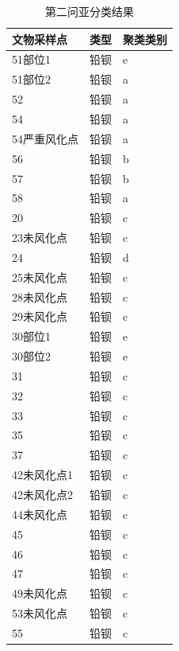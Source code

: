 \documentclass[UTF8]{ctexart}
\begin{document}
\begin{table}[H]
    \centering
    \caption{第二问亚分类结果}
    \begin{tabular}{|l|l|l|}
        \hline
        文物采样点   & 类型 & 聚类类别 \\ \hline
        51部位1      & 铅钡 & e        \\ \hline
        51部位2      & 铅钡 & a        \\ \hline
        52           & 铅钡 & a        \\ \hline
        54           & 铅钡 & a        \\ \hline
        54严重风化点 & 铅钡 & a        \\ \hline
        56           & 铅钡 & b        \\ \hline
        57           & 铅钡 & b        \\ \hline
        58           & 铅钡 & a        \\ \hline
        20           & 铅钡 & c        \\ \hline
        23未风化点   & 铅钡 & c        \\ \hline
        24           & 铅钡 & d        \\ \hline
        25未风化点   & 铅钡 & c        \\ \hline
        28未风化点   & 铅钡 & c        \\ \hline
        29未风化点   & 铅钡 & c        \\ \hline
        30部位1      & 铅钡 & e        \\ \hline
        30部位2      & 铅钡 & e        \\ \hline
        31           & 铅钡 & c        \\ \hline
        32           & 铅钡 & c        \\ \hline
        33           & 铅钡 & c        \\ \hline
        35           & 铅钡 & c        \\ \hline
        37           & 铅钡 & c        \\ \hline
        42未风化点1  & 铅钡 & c        \\ \hline
        42未风化点2  & 铅钡 & c        \\ \hline
        44未风化点   & 铅钡 & c        \\ \hline
        45           & 铅钡 & c        \\ \hline
        46           & 铅钡 & c        \\ \hline
        47           & 铅钡 & c        \\ \hline
        49未风化点   & 铅钡 & c        \\ \hline
        53未风化点   & 铅钡 & c        \\ \hline
        55           & 铅钡 & c        \\ \hline
    \end{tabular}
\end{table}
\end{document}

